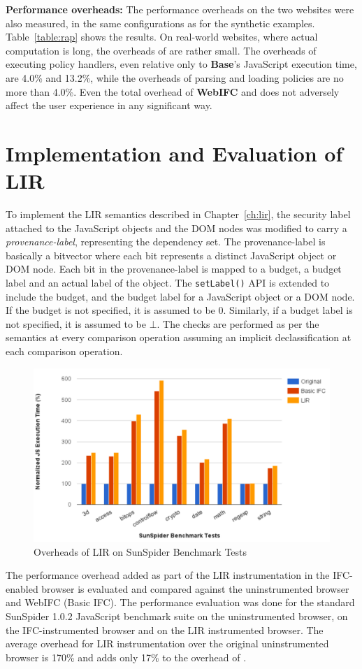 \noindent
\textbf{Performance overheads:} The performance overheads 
on the two websites were also measured, in the same configurations as
for the synthetic examples. Table~\ref{table:rap} shows the
results. On real-world websites, where actual computation is long, the
overheads of {\sys} are rather small. The overheads of executing
policy handlers, even relative only to \textbf{Base}'s JavaScript
execution time, are 4.0\% and 13.2\%, while the overheads of parsing
and loading policies are no more than 4.0\%. Even the total overhead
of \textbf{WebIFC} and \textbf{\sys} does not adversely affect the user
experience in any significant way.

\section{Implementation and Evaluation of LIR}
\label{sec:impllir}

To implement the LIR semantics described in Chapter~\ref{ch:lir}, the
security label attached to the JavaScript objects and the DOM nodes
was modified to carry a \emph{provenance-label}, representing the dependency
set. The provenance-label is basically a bitvector where each bit
represents a distinct JavaScript object or DOM node. Each bit in the
provenance-label is mapped to a budget, a budget label and an actual
label of the object. The \texttt{setLabel()} API is extended to
include the budget, and the budget label for a JavaScript object or a
DOM node. If the budget is not specified, it is assumed to be
$0$. Similarly, if a budget label is not specified, it is assumed to
be $\bot$. The checks are performed as per the semantics at every
comparison operation assuming an implicit declassification at 
each comparison operation.

\begin{figure}
  \centering
    \includegraphics[width=0.8\linewidth]{chapters/browser/LIR.pdf}
  \caption{Overheads of LIR on SunSpider Benchmark Tests}
  \label{fig:dom}
\end{figure}

The performance overhead added as part of the LIR instrumentation in
the IFC-enabled browser is evaluated and compared against the
uninstrumented browser and WebIFC (Basic IFC). 
The performance evaluation was done for the standard
SunSpider 1.0.2 JavaScript benchmark suite on the uninstrumented
browser, on the IFC-instrumented browser and on the LIR instrumented
browser. The average overhead for LIR instrumentation over the
original uninstrumented browser is 170\% and adds only 17\% to the
overhead of \sys.
